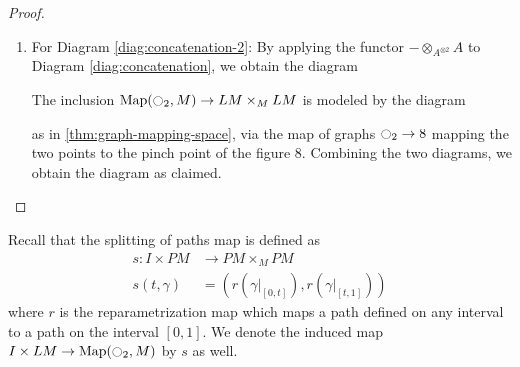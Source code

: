 \documentclass{scrartcl}
\theoremstyle{plain}
\theoremstyle{definition}
\newtheorem{remark}[theorem]{Remark}
\newcommand{\R}{\mathbb R}
\newcommand{\Z}{\mathbb Z}
\DeclareMathOperator{\Map}{Map}
\newcommand{\blank}{-}
\begin{document}
\begin{proof}
\begin{enumerate}
    \item For Diagram \ref{diag:concatenation-2}: By applying the functor $\blank \otimes_{A^{\otimes 2}} A$ to Diagram \ref{diag:concatenation}, we obtain the diagram
    \begin{center}
    \end{center}
    The inclusion $\Map(\ocircle_2, M)\to LM\times_M LM$ is modeled by the diagram
    \begin{center}
    \end{center}
    as in \ref{thm:graph-mapping-space}, via the map of graphs $\ocircle_2\to 8$ mapping the two points to the pinch point of the figure $8$. Combining the two diagrams, we obtain the diagram as claimed.
\end{enumerate}
\end{proof}

Recall that the splitting of paths map is defined as
\begin{align*} 
    s\colon I\times PM &\to PM\times_M PM\\
    s(t, \gamma)&=\left(r(\gamma|_{[0, t]}) , r(\gamma|_{[t, 1]})\right)
\end{align*}
where $r$ is the reparametrization map which maps a path defined on any interval to a path on the interval $[0,1]$. We denote the induced map $I\times LM\to \Map(\ocircle_2, M)$ by $s$ as well.

\end{document}
